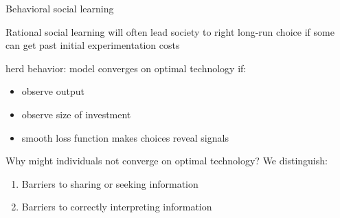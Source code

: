 \documentclass[aspectratio=169, 10pt, handout]{beamer}
\newenvironment{wideitemize}{\itemize\addtolength{\itemsep}{10pt}}{\enditemize}
\begin{document}
\begin{frame}{Behavioral social learning}

\begin{wideitemize}

	\item Rational social learning will often lead society to right long-run choice if some can get past initial experimentation costs

	\item \cite{banerjee1992simple} herd behavior: model converges on optimal technology if: 

	\begin{itemize}
	
		\item observe output

		\item observe size of investment

		\item smooth loss function makes choices reveal signals 

	\end{itemize}

	\item Why might individuals not converge on optimal technology? We distinguish:
	
	\begin{enumerate}[(1)] 
	
		\item Barriers to sharing or seeking information
		
		\item Barriers to correctly interpreting information

	\end{enumerate}
	
\end{wideitemize}


\end{frame}
\end{document}
